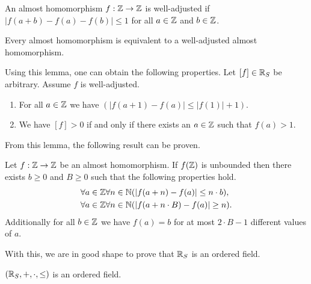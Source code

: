 \documentclass[../main.tex]{subfiles}
\begin{document}
\begin{definition}
    An almost homomorphism $f:\mathbb{Z}\to\mathbb{Z}$ is well-adjusted if $\vert f(a+b)-f(a)-f(b)\vert\leq1$ for all $a\in\mathbb{Z}$ and $b\in\mathbb{Z}$.
\end{definition}
\begin{lemma}\label{lma:the_real_numbers:concentration_lemma}
    Every almost homomorphism is equivalent to a well-adjusted almost homomorphism.
\end{lemma}
Using this lemma, one can obtain the following properties. Let $[f]\in\mathbb{R}_S$ be arbitrary. Assume $f$ is well-adjusted.
\begin{enumerate}
    \item For all $a\in\mathbb{Z}$ we have $(\vert f(a+1)-f(a)\vert\leq\vert f(1)\vert+1)$.
    \item We have $[f]>0$ if and only if there exists an $a\in\mathbb{Z}$ such that $f(a)>1$.
\end{enumerate}
From this lemma, the following result can be proven.
\begin{lemma}\label{lma:the_real_numbers:almost_homomorphism_each_value_finitely_often}
    Let $f:\mathbb{Z}\to\mathbb{Z}$ be an almost homomorphism. If $f(\mathbb{Z})$ is unbounded then there exists $b\geq0$ and $B\geq0$ such that the following properties hold.
    \begin{align*}
        & \forall a\in\mathbb{Z}\forall n\in\mathbb{N}(\vert f(a+n)-f(a)\vert\leq n\cdot b), \\
        & \forall a\in\mathbb{Z}\forall n\in\mathbb{N}(\vert f(a+n\cdot B)-f(a)\vert\geq n).
    \end{align*}
    Additionally for all $b\in\mathbb{Z}$ we have $f(a)=b$ for at most $2\cdot B-1$ different values of $a$.
\end{lemma}
With this, we are in good shape to prove that $\mathbb{R}_S$ is an ordered field.
\begin{proposition}\label{prp:the_real_numbers:schanuel_ordered_field_real_numbers}
    $(\mathbb{R}_S,+,\cdot,\leq)$ is an ordered field.
\end{proposition}
\end{document}
